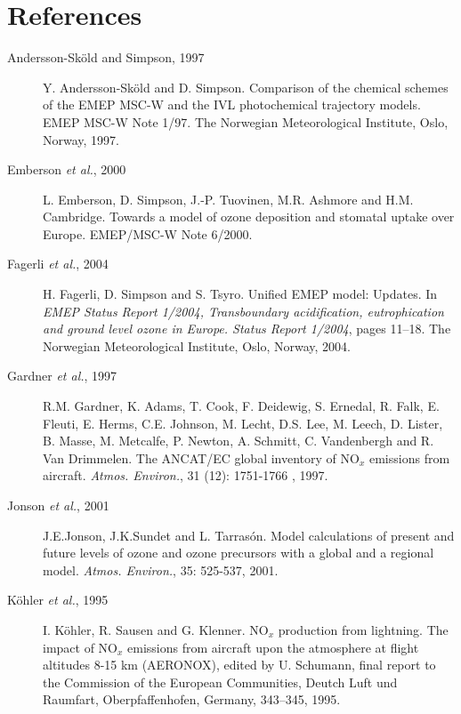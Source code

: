 \chapter*{References}
\label{ch:References}

\begin{description}

\item[Andersson-Sk{\"o}ld and Simpson, 1997] Y. Andersson-Sk\"{o}ld
  and D. Simpson. Comparison of the chemical schemes of the {EMEP MSC-W}
		  and the {IVL} photochemical trajectory models. EMEP
                  MSC-W Note 1/97. The Norwegian
Meteorological Institute, Oslo, Norway, 1997.

\item[Emberson {\sl et al.}, 2000] L. Emberson, D. Simpson,
  J.-P. Tuovinen, M.R. Ashmore and H.M. Cambridge. Towards a model of
  ozone deposition and stomatal uptake over Europe. EMEP/MSC-W
  Note 6/2000.

\item[Fagerli {\sl et al.}, 2004] H. Fagerli, D. Simpson and
  S. Tsyro.
 Unified EMEP model: Updates. In {\it EMEP Status Report
    1/2004, Transboundary acidification, eutrophication and ground
    level ozone in Europe. Status Report 1/2004}, pages 11--18. The Norwegian
Meteorological Institute, Oslo, Norway, 2004.

\item[Gardner {\sl et al.}, 1997] R.M. Gardner, K. Adams, T. Cook,
  F. Deidewig, S. Ernedal, R. Falk, E. Fleuti, E. Herms, C.E. Johnson,
  M. Lecht, D.S. Lee, M. Leech, D. Lister, B. Masse, M. Metcalfe,
  P. Newton, A. Schmitt, C. Vandenbergh and R. Van Drimmelen. The
  ANCAT/EC global inventory of NO$_x$ emissions from 
		  aircraft. {\it Atmos. Environ.}, 31 (12): 1751-1766
, 1997.


\item[Jonson {\sl et al.}, 2001] J.E.Jonson, J.K.Sundet and
  L. Tarras{\'o}n. Model calculations of present and future levels of
ozone and ozone precursors with a global and a regional model. {\it
  Atmos. Environ.}, 35: 525-537, 2001.  


\item[K{\"o}hler {\sl et al.}, 1995] I. K{\"o}hler, R. Sausen and
  G. Klenner. 
NO$_x$ production from lightning. The impact of NO$_x$ emissions from
aircraft upon the atmosphere at flight altitudes 8-15 km (AERONOX),
edited by U. Schumann, final report to the Commission of the European
Communities, Deutch Luft und Raumfart, Oberpfaffenhofen, Germany,
343--345, 1995.



\end{description}
